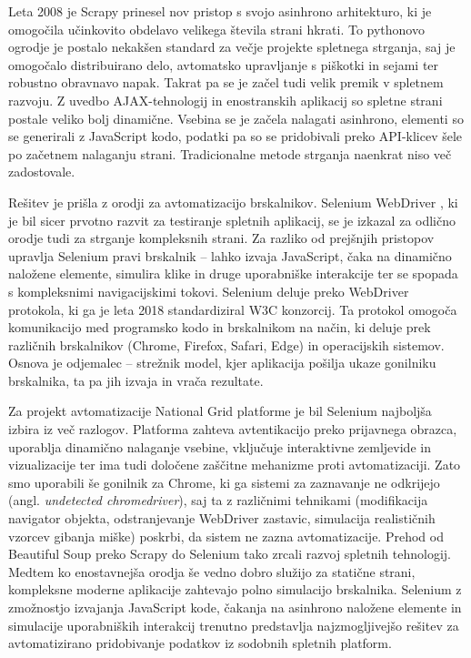 \documentclass[a4paper,12pt,openright]{book}
\begin{document}
Leta 2008 je Scrapy \cite{scrapy} prinesel nov pristop s svojo asinhrono arhitekturo, ki je omogočila učinkovito obdelavo velikega števila strani hkrati. To pythonovo ogrodje je postalo nekakšen standard za večje projekte spletnega strganja, saj je omogočalo distribuirano delo, avtomatsko upravljanje s piškotki in sejami ter robustno obravnavo napak.
Takrat pa se je začel tudi velik premik v spletnem razvoju. Z uvedbo AJAX-tehnologij in enostranskih aplikacij so spletne strani postale veliko bolj dinamične. Vsebina se je začela nalagati asinhrono, elementi so se generirali z JavaScript kodo, podatki pa so se pridobivali preko API-klicev šele po začetnem nalaganju strani. Tradicionalne metode strganja naenkrat niso več zadostovale.

Rešitev je prišla z orodji za avtomatizacijo brskalnikov. Selenium WebDriver \cite{selenium_webdriver}, ki je bil sicer prvotno razvit za testiranje spletnih aplikacij, se je izkazal za odlično orodje tudi za strganje kompleksnih strani. Za razliko od prejšnjih pristopov upravlja Selenium pravi brskalnik – lahko izvaja JavaScript, čaka na dinamično naložene elemente, simulira klike in druge uporabniške interakcije ter se spopada s kompleksnimi navigacijskimi tokovi.
Selenium deluje preko WebDriver protokola, ki ga je leta 2018 standardiziral W3C konzorcij. Ta protokol omogoča komunikacijo med programsko kodo in brskalnikom na način, ki deluje prek različnih brskalnikov (Chrome, Firefox, Safari, Edge) in operacijskih sistemov. Osnova je odjemalec – strežnik model, kjer aplikacija pošilja ukaze gonilniku brskalnika, ta pa jih izvaja in vrača rezultate.

Za projekt avtomatizacije National Grid platforme je bil Selenium najboljša izbira iz več razlogov. Platforma zahteva avtentikacijo preko prijavnega obrazca, uporablja dinamično nalaganje vsebine, vključuje interaktivne zemljevide in vizualizacije ter ima tudi določene zaščitne mehanizme proti avtomatizaciji. Zato smo uporabili še gonilnik za Chrome, ki ga sistemi za zaznavanje ne odkrijejo (angl. \textit{undetected chromedriver}), saj ta z različnimi tehnikami (modifikacija navigator objekta, odstranjevanje WebDriver zastavic, simulacija realističnih vzorcev gibanja miške) poskrbi, da sistem ne zazna avtomatizacije.
Prehod od Beautiful Soup preko Scrapy do Selenium tako zrcali razvoj spletnih tehnologij. Medtem ko enostavnejša orodja še vedno dobro služijo za statične strani, kompleksne moderne aplikacije zahtevajo polno simulacijo brskalnika. Selenium z zmožnostjo izvajanja JavaScript kode, čakanja na asinhrono naložene elemente in simulacije uporabniških interakcij trenutno predstavlja najzmogljivejšo rešitev za avtomatizirano pridobivanje podatkov iz sodobnih spletnih platform.
\end{document}
